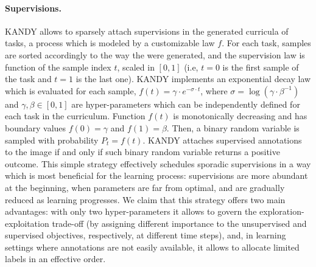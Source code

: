 
%

\paragraph{Supervisions.} \textsc{KANDY} allows to sparsely attach supervisions in the generated curricula of tasks, a process which is modeled by a customizable law $f$. For each task, samples are sorted accordingly to the way the were generated, and the supervision law is function of the sample index $t$, scaled in $[0, 1]$ (i.e, $t=0$ is the first sample of the task and $t=1$ is the last one). %
\textsc{KANDY} implements an exponential decay law which is evaluated for each sample, $f(t) = \gamma \cdot e^{-\sigma \cdot t}$, where $\sigma = \log(\gamma \cdot \beta^{-1})$ and $\gamma, \beta \in [0, 1]$ are hyper-parameters which can be independently defined for each task in the curriculum.
Function $f(t)$ is monotonically decreasing and has boundary values $f(0) = \gamma$ and $f(1) = \beta$.
Then, a binary random variable is sampled with probability $P_t = f(t)$. \textsc{KANDY} attaches supervised annotations to the image if and only if such binary random variable returns a positive outcome.
This simple strategy effectively schedules sporadic supervisions in a way which is most beneficial for the learning process: supervisions are more abundant at the beginning, when parameters are far from optimal, and are gradually reduced as learning progresses.
We claim that this strategy offers two main advantages: with only two hyper-parameters it allows to govern the exploration-exploitation trade-off (by assigning different importance to the unsupervised and supervised objectives, respectively, at different time steps), and, in learning settings where annotations are not easily available, it allows to allocate limited labels in an effective order.

